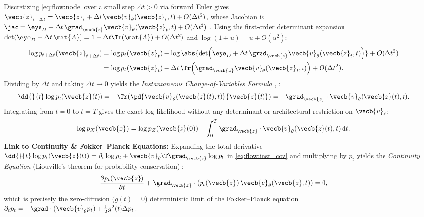 \documentclass[../../../../master.tex]{subfiles}
\begin{document}
\begin{coremath}
Discretizing \eqref{eq:flow:node} over a small step $\Delta t > 0$ via forward Euler gives $\vecb{z}_{t+\Delta t} = \vecb{z}_t + \Delta t\,\vecb{v}_\theta(\vecb{z}_t, t) + O(\Delta t^2)$, whose Jacobian is $\jac = \eye_D + \Delta t\,\grad_{\vecb{z}}\vecb{v}_\theta(\vecb{z}_t, t) + O(\Delta t^2)$ . Using the first-order determinant expansion $\det(\eye_D + \Delta t\,\mat{A}) = 1 + \Delta t\Tr(\mat{A}) + O(\Delta t^2)$ and $\log(1 + u) = u + O(u^2)$:
\begin{align}
  \log p_{t+\Delta t}(\vecb{z}_{t+\Delta t}) &= \log p_t(\vecb{z}_t) - \log \abs{\det\!\left(\eye_D + \Delta t\,\grad_{\vecb{z}}\vecb{v}_\theta(\vecb{z}_t, t)\right)} + O(\Delta t^2) \nonumber \\
  &= \log p_t(\vecb{z}_t) - \Delta t\,\Tr\!\left(\grad_{\vecb{z}}\vecb{v}_\theta(\vecb{z}_t, t)\right) + O(\Delta t^2). \label{eq:flow:euler_logp}
\end{align}
Dividing by $\Delta t$ and taking $\Delta t \to 0$ yields the \emph{Instantaneous Change-of-Variables Formula} , :
\begin{equation}\label{eq:flow:inst_cov}
  \dd{}{t}\log p_t(\vecb{z}(t)) = -\Tr\!\left(\pd{\vecb{v}_\theta(\vecb{z}(t), t)}{\vecb{z}(t)}\right) = -\grad_{\vecb{z}} \cdot \vecb{v}_\theta(\vecb{z}(t), t).
\end{equation}
Integrating from $t=0$ to $t=T$ gives the exact log-likelihood without any determinant or architectural restriction on $\vecb{v}_\theta$:
\begin{equation}\label{eq:flow:cnf_loglik}
  \log p_X(\vecb{x}) = \log p_Z(\vecb{z}(0)) - \int_0^T \grad_{\vecb{z}} \cdot \vecb{v}_\theta(\vecb{z}(t), t)\,\mathrm{d}t.
\end{equation}
\textbf{Link to Continuity \& Fokker--Planck Equations:} Expanding the total derivative $\dd{}{t}\log p_t(\vecb{z}(t)) = \partial_t \log p_t + \vecb{v}_\theta\T \grad_{\vecb{z}}\log p_t$ in \eqref{eq:flow:inst_cov} and multiplying by $p_t$ yields the \emph{Continuity Equation} (Liouville's theorem for probability conservation) :
\begin{equation}\label{eq:flow:continuity}
  \frac{\partial p_t(\vecb{z})}{\partial t} + \grad_{\vecb{z}} \cdot \left(p_t(\vecb{z})\,\vecb{v}_\theta(\vecb{z}, t)\right) = 0,
\end{equation}
which is precisely the zero-diffusion ($g(t)=0$) deterministic limit of the Fokker--Planck equation $\partial_t p_t = -\grad \cdot (\vecb{v}_\theta p_t) + \frac{1}{2}g^2(t)\Delta p_t$.
\end{coremath}
\end{document}
